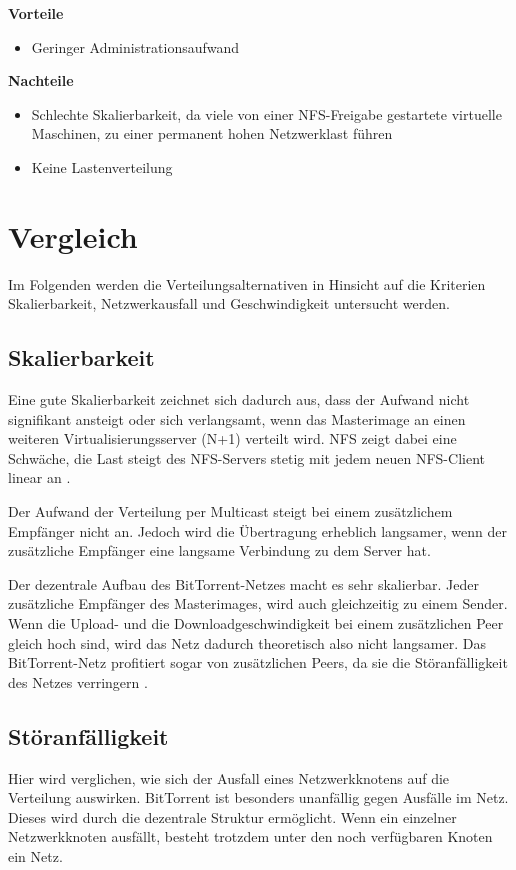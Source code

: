 
\textbf{Vorteile}
\begin{itemize}
 \item Geringer Administrationsaufwand
\end{itemize}

\textbf{Nachteile}
\begin{itemize}
 \item Schlechte Skalierbarkeit, da viele von einer NFS-Freigabe gestartete virtuelle Maschinen, zu einer permanent hohen Netzwerklast führen
 \item Keine Lastenverteilung
\end{itemize}

\section{Vergleich}
Im Folgenden werden die Verteilungsalternativen in Hinsicht auf die Kriterien Skalierbarkeit, Netzwerkausfall und Geschwindigkeit untersucht werden.

{ \fontsize{12.4pt}{16pt}\selectfont
\subsection{Skalierbarkeit}
Eine gute Skalierbarkeit zeichnet sich dadurch aus, dass der Aufwand nicht signifikant ansteigt oder sich verlangsamt, wenn das Masterimage an einen weiteren Virtualisierungsserver (N+1) verteilt wird. NFS zeigt dabei eine Schwäche, die Last steigt des NFS-Servers stetig mit jedem neuen NFS-Client linear an \cite{nfsharmful}. 

Der Aufwand der Verteilung per Multicast steigt bei einem zusätzlichem Empfänger nicht an. Jedoch wird die Übertragung erheblich langsamer, wenn der zusätzliche Empfänger eine langsame Verbindung zu dem Server hat. 

Der dezentrale Aufbau des BitTorrent-Netzes macht es sehr skalierbar. Jeder zusätzliche Empfänger des Masterimages, wird auch gleichzeitig zu einem Sender. Wenn die Upload- und die Downloadgeschwindigkeit bei einem zusätzlichen Peer gleich hoch sind, wird das Netz dadurch theoretisch also nicht langsamer. Das BitTorrent-Netz profitiert sogar von zusätzlichen Peers, da sie die Störanfälligkeit des Netzes verringern \cite{btscalability}. 

\subsection{Störanfälligkeit}
Hier wird verglichen, wie sich der Ausfall eines Netzwerkknotens auf die Verteilung auswirken. BitTorrent ist besonders unanfällig gegen Ausfälle im Netz. Dieses wird durch die dezentrale Struktur ermöglicht. Wenn ein einzelner Netzwerkknoten ausfällt, besteht trotzdem unter den noch verfügbaren Knoten ein Netz. }

